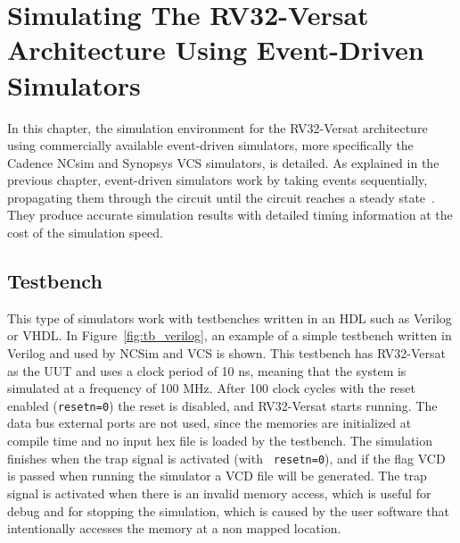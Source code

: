 \chapter{Simulating The RV32-Versat Architecture Using Event-Driven Simulators}
\label{chapter:sim_event}

In this chapter, the simulation environment for the RV32-Versat architecture
using commercially available event-driven simulators, more specifically the
Cadence NCsim and Synopsys VCS simulators, is detailed. As explained in the
previous chapter, event-driven simulators work by taking events sequentially,
propagating them through the circuit until the circuit reaches a steady
state~\cite{tan:vhstas,gunes:survey,palnitkar:verilog}. They produce accurate
simulation results with detailed timing information at the cost of the
simulation speed.

\section{Testbench}
\label{section:tb}

This type of simulators work with testbenches written in an \ac{HDL} such as
Verilog or VHDL. In Figure~\ref{fig:tb_verilog}, an example of a simple
testbench written in Verilog and used by NCSim and VCS is shown. This testbench
has RV32-Versat as the \ac{UUT} and uses a clock period of 10 ns, meaning that
the system is simulated at a frequency of 100 MHz. After 100 clock cycles with
the reset enabled ({\tt resetn=0}) the reset is disabled, and RV32-Versat starts
running. The data bus external ports are not used, since the memories are
initialized at compile time and no input hex file is loaded by the
testbench. The simulation finishes when the trap signal is activated (with {\tt
  resetn=0}), and if the flag VCD is passed when running the simulator a \ac{VCD}
file will be generated. The trap signal is activated when there is an invalid
memory access, which is useful for debug and for stopping the simulation, which
is caused by the user software that intentionally accesses the memory at a non
mapped location.

